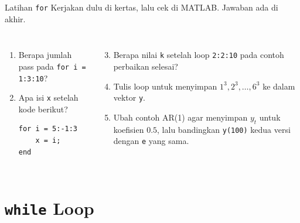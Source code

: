 \documentclass[aspectratio=169,11pt]{beamer}
\begin{document}
\begin{frame}[fragile]{Latihan \texttt{for}}
\small Kerjakan dulu di kertas, lalu cek di MATLAB. Jawaban ada di akhir.
\begin{columns}[T]
\begin{enumerate}
  \item Berapa jumlah pass pada \texttt{for i = 1:3:10}?
  \item Apa isi \texttt{x} setelah kode berikut?
\begin{lstlisting}[basicstyle=\ttfamily\footnotesize]
for i = 5:-1:3
    x = i;
end
\end{lstlisting}
\end{enumerate}
\begin{enumerate}\setcounter{enumi}{2}
  \item Berapa nilai \texttt{k} setelah loop \texttt{2:2:10} pada contoh
        perbaikan selesai?
  \item Tulis loop untuk menyimpan $1^3, 2^3, \dots, 6^3$ ke dalam vektor
        \texttt{y}.
  \item Ubah contoh AR(1) agar menyimpan $y_t$ untuk koefisien $0.5$, lalu
        bandingkan \texttt{y(100)} kedua versi dengan \texttt{e} yang sama.
\end{enumerate}
\end{columns}
\end{frame}

\section{\texttt{while} Loop}
\end{document}

